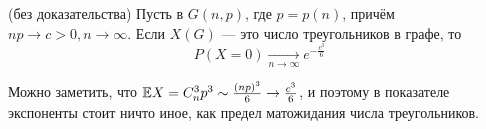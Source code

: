 \begin{theorem} (без доказательства)
	Пусть в $G(n, p)$, где $p = p(n)$, причём $np \to c > 0, n \to \infty$. Если $X(G)$ --- это число треугольников в графе, то
	\[
		P(X = 0) \xrightarrow[n \to \infty]{} e^{-\frac{c^3}6}
	\]
\end{theorem}

\begin{note}
	Можно заметить, что $\mathbb{E} X = C_n^3 p^3 \sim \frac{(np)^3}{6} \to \frac{c^3}{6}$, и поэтому в показателе экспоненты стоит ничто иное, как предел матожидания числа треугольников.
\end{note}